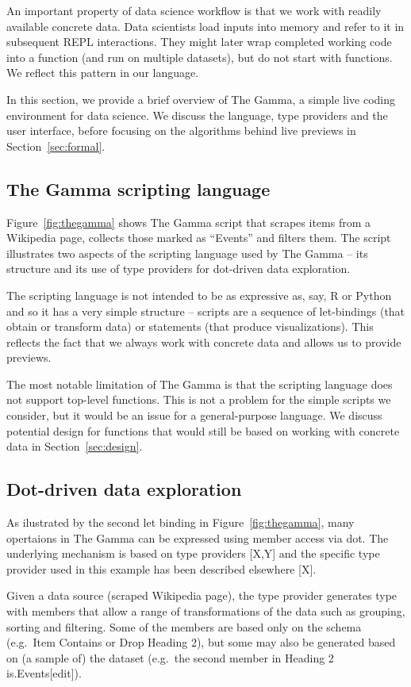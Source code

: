 \documentclass[sigplan,10pt]{acmart}\settopmatter{printfolios=true,printccs=false,printacmref=false}
\theoremstyle{plain}
\theoremstyle{definition}
\newcommand{\ident}[1]{\textnormal{\sffamily #1}}
\begin{document}
An important property of data science workflow is that we work with readily available concrete data.
Data scientists load inputs into memory and refer to it in subsequent REPL interactions. They might 
later wrap completed working code into a function (and run on multiple datasets), but 
do not start with functions. We reflect this pattern in our language. 

In this section, we provide a brief overview of The Gamma, a simple live coding environment for
data science. We discuss the language, type providers and the user interface,
before focusing on the algorithms behind live previews in Section~\ref{sec:formal}.

\subsection{The Gamma scripting language}
Figure~\ref{fig:thegamma} shows The Gamma script that scrapes items from a Wikipedia page, 
collects those marked as ``Events'' and filters them. The script illustrates two aspects of the
scripting language used by The Gamma -- its structure and its use of type providers for
dot-driven data exploration.

The scripting language is not intended to be as expressive as, say, R or Python and so it
has a very simple structure -- scripts are a sequence of let-bindings (that obtain or transform 
data) or statements (that produce visualizations). This reflects the fact that we always work
with concrete data and allows us to provide previews.

The most notable limitation of The Gamma is that the scripting language does not support top-level 
functions. This is not a problem for the simple scripts we consider, but it would be an issue for
a general-purpose language. We discuss potential design for functions that would still be based
on working with concrete data in Section~\ref{sec:design}.

\subsection{Dot-driven data exploration}

As ilustrated by the second let binding in Figure~\ref{fig:thegamma}, many opertaions
in The Gamma can be expressed using member access via dot. The underlying mechanism is based
on type providers [X,Y] and the specific type provider used in this example has been described 
elsewhere [X].

Given a data source (scraped Wikipedia page), the type provider generates type with members that allow
a range of transformations of the data such as grouping, sorting and filtering. Some of the members
are based only on the schema (e.g.~\ident{\textquotesingle Item Contains\textquotesingle} or 
\ident{\textquotesingle Drop Heading 2\textquotesingle}), but some may also be generated based
on (a sample of) the dataset (e.g.~the second member in \ident{\textquotesingle Heading 2 
is\textquotesingle.\textquotesingle Events[edit]\textquotesingle}). 
\end{document}
